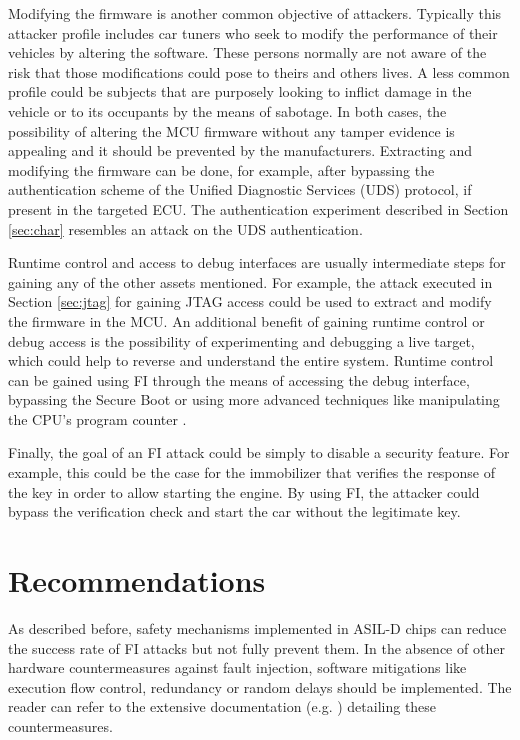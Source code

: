 \documentclass[10pt, conference, compsocconf]{IEEEtran}
\begin{document}
Modifying the firmware is another common objective of attackers. Typically this attacker profile includes car tuners who seek to modify the performance of their vehicles by altering the software. These persons normally are not aware of the risk that those 
modifications could pose to theirs and others lives. A less common profile could be subjects that are purposely looking to inflict damage in the vehicle or to its occupants by the means of sabotage. In both cases, the possibility of altering the MCU firmware without any tamper evidence is appealing and it should be prevented by the manufacturers. Extracting and modifying the firmware can be done, for example, after bypassing the authentication scheme of the Unified Diagnostic Services (UDS) protocol, if present in the targeted ECU. The authentication experiment described in Section \ref{sec:char} resembles an attack on the UDS authentication.

Runtime control and access to debug interfaces are usually intermediate steps for gaining any of the other assets mentioned. For example, the attack executed in Section \ref{sec:jtag} for gaining JTAG access could be used to extract and modify the firmware in the MCU. An additional benefit of gaining runtime control or debug access is the possibility of experimenting and debugging a live target, which could help to reverse and understand the entire system. Runtime control can be gained using FI through the means of accessing the debug interface, bypassing the Secure Boot or using more advanced techniques like manipulating the CPU's program counter \cite{timmers_controlling_2016}.

Finally, the goal of an FI attack could be simply to disable a security feature. For example, this could be the case for the immobilizer that verifies the response of the key in order to allow starting the engine. By using FI, the attacker could bypass the verification check and start the car without the legitimate key.


\section{Recommendations}
As described before, safety mechanisms implemented in ASIL-D chips can reduce the success rate of FI attacks but not fully prevent them. In the absence of other hardware countermeasures against fault injection, software mitigations like execution flow control, redundancy or random delays should be implemented. The reader can refer to the extensive documentation (e.g. 
\cite{verbauwhede_fault_2011}
) detailing these countermeasures.
\end{document}
